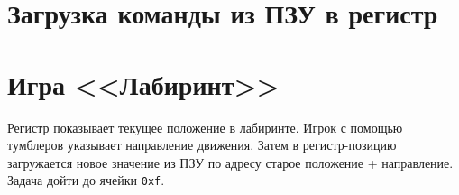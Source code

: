 \section{Загрузка команды из ПЗУ в регистр}


\section{Игра <<Лабиринт>>}

Регистр показывает текущее положение в лабиринте. Игрок с помощью тумблеров указывает направление движения.
Затем в регистр-позицию загружается новое значение из ПЗУ по адресу старое положение + направление.
Задача дойти до ячейки {\tt 0xf}.

